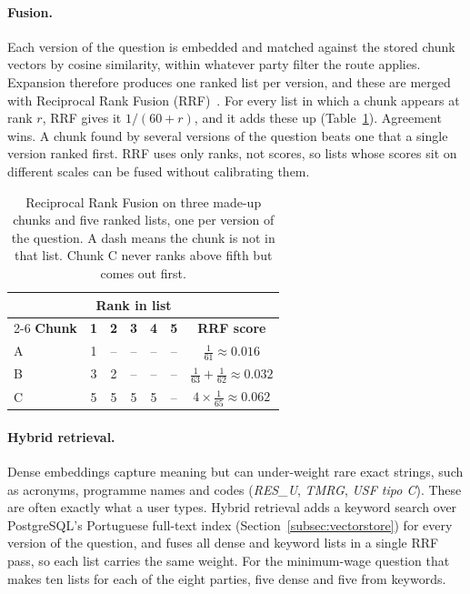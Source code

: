 \paragraph{Fusion.} Each version of the question is embedded and matched
against the stored chunk vectors by cosine similarity, within whatever party
filter the route applies. Expansion therefore produces one ranked list per
version, and these are merged with Reciprocal Rank Fusion
(RRF)~\citep{cormack2009rrf}. For every list in which a chunk appears at
rank $r$, RRF gives it $1/(60 + r)$, and it adds these up
(Table~\ref{tab:rrf}). Agreement wins. A chunk found by several versions of
the question beats one that a single version ranked first. RRF uses only
ranks, not scores, so lists whose scores sit on different scales can be fused
without calibrating them.

\begin{table}[htbp]
    \centering
    \begin{tabular}{|l|c|c|c|c|c|c|}
        \hline
        & \multicolumn{5}{c|}{\textbf{Rank in list}} & \\
        \cline{2-6}
        \textbf{Chunk} & \textbf{1} & \textbf{2} & \textbf{3} & \textbf{4} & \textbf{5} & \textbf{RRF score} \\
        \hline
        A & 1 & -- & -- & -- & -- & $\frac{1}{61} \approx 0.016$ \\
        B & 3 & 2 & -- & -- & -- & $\frac{1}{63} + \frac{1}{62} \approx 0.032$ \\
        C & 5 & 5 & 5 & 5 & -- & $4 \times \frac{1}{65} \approx 0.062$ \\
        \hline
    \end{tabular}
    \caption[Reciprocal Rank Fusion]{Reciprocal Rank Fusion on three made-up
    chunks and five ranked lists, one per version of the question. A dash means
    the chunk is not in that list. Chunk C never ranks above fifth but comes
    out first.}
    \label{tab:rrf}
\end{table}

\paragraph{Hybrid retrieval.} Dense embeddings capture meaning but can
under-weight rare exact strings, such as acronyms, programme names and codes
(\textit{RES\_U}, \textit{TMRG}, \textit{USF tipo C}). These are often exactly
what a user types. Hybrid retrieval adds a keyword search over PostgreSQL's
Portuguese full-text index (Section~\ref{subsec:vectorstore}) for every
version of the question, and fuses all dense and keyword lists in a single RRF
pass, so each list carries the same weight. For the minimum-wage question that
makes ten lists for each of the eight parties, five dense and five from
keywords.


